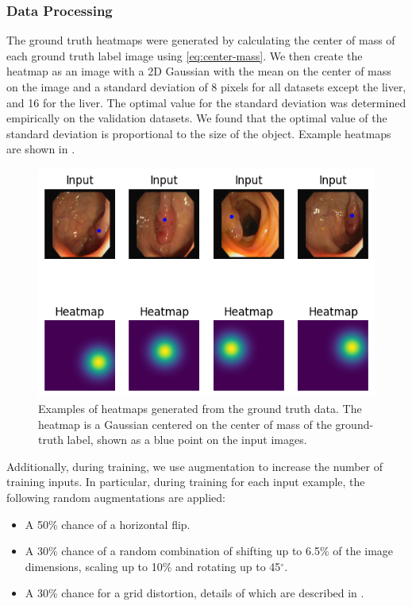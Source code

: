 \subsubsection{Data Processing}
 
The ground truth heatmaps were generated by calculating the center of mass of each ground truth label 
image using \eqref{eq:center-mass}. We then create the heatmap as an image with a 2D Gaussian with the
mean on 
the center of mass on the image and a standard deviation of 8 pixels for all datasets except the liver, and 16 for the liver. The optimal value for the standard deviation was determined empirically on the 
validation datasets. We found that the optimal value of the standard deviation is proportional to the size 
of the object.
Example heatmaps are shown in 
.

	\begin{figure}[h]
		\centering
		\includegraphics[width=0.8\linewidth]{images/4/heatmaps}
		\caption{Examples of heatmaps generated from the ground truth data. The heatmap is a Gaussian centered on the center of mass of the ground-truth label, shown as a blue point on the input images. \cite{bencevicTrainingPolarImage2021}}
		\label{fig:heatmap}
	\end{figure}
	
\pagebreak
	
Additionally, during training, we use augmentation to increase the number of training inputs. In 
particular, during training for each input example, the following random augmentations are applied:

\begin{itemize}
  \item A 50\% chance of a horizontal flip.
  \item A 30\% chance of a random combination of shifting up to 6.5\% of the image dimensions, scaling up 
    to 10\% and rotating up to 45$^{\circ}$.
  \item A 30\% chance for a grid distortion, details of which are described in \cite{info11020125}.
\end{itemize}

